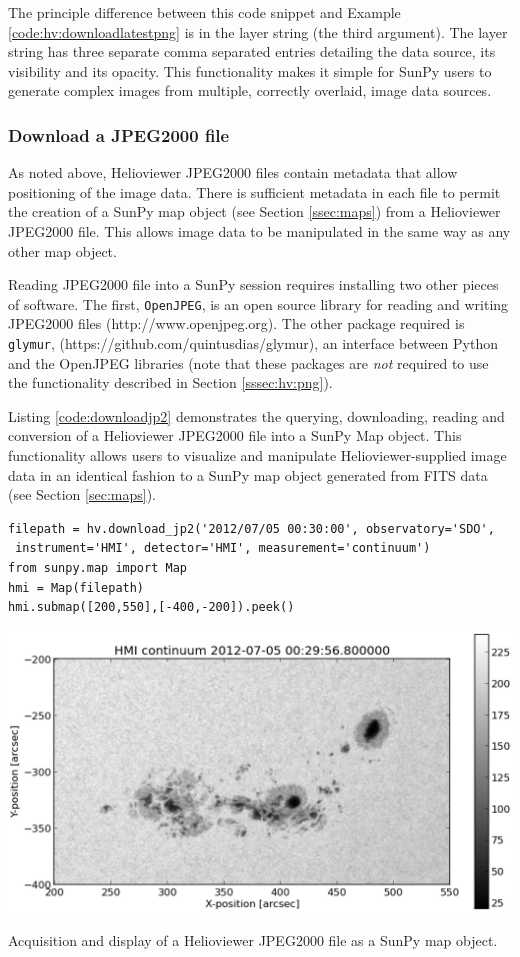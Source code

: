 The principle difference between this code snippet and Example
\ref{code:hv:downloadlatestpng} is in the layer string (the third
argument).  The layer string has three separate comma separated
entries detailing the data source, its visibility and its opacity.
This functionality makes it simple for SunPy users to generate complex
images from multiple, correctly overlaid, image data sources.


\subsubsection{Download a JPEG2000 file}\label{sssec:hv:jp}

As noted above, Helioviewer JPEG2000 files contain metadata that allow
positioning of the image data.  There is sufficient metadata in each
file to permit the creation of a SunPy map object (see Section
\ref{ssec:maps}) from a Helioviewer JPEG2000 file.  This allows image
data to be manipulated in the same way as any other map object.

Reading JPEG2000 file into a SunPy session requires installing two
other pieces of software. The first, \texttt{OpenJPEG}, is an open
source library for reading and writing JPEG2000 files
(http://www.openjpeg.org).  The other package required is
\texttt{glymur}, (https://github.com/quintusdias/glymur), an interface
between Python and the OpenJPEG libraries (note that these packages
are {\it not} required to use the functionality described in Section
\ref{sssec:hv:png}).

Listing \ref{code:downloadjp2} demonstrates the querying, downloading,
reading and conversion of a Helioviewer JPEG2000 file into a SunPy Map
object.  This functionality allows users to visualize and manipulate
Helioviewer-supplied image data in an identical fashion to a SunPy map
object generated from FITS data (see Section \ref{sec:maps}).

\begin{listing}
\begin{verbatim}
filepath = hv.download_jp2('2012/07/05 00:30:00', observatory='SDO',
 instrument='HMI', detector='HMI', measurement='continuum')
from sunpy.map import Map
hmi = Map(filepath)
hmi.submap([200,550],[-400,-200]).peek()
\end{verbatim}
\includegraphics[width=0.8\columnwidth]{helioviewer_hmi_continuum_jp2_to_map.eps}
\caption{Acquisition and display of a Helioviewer JPEG2000 file as a
  SunPy map object.}
\label{code:downloadjp2}
\end{listing}
